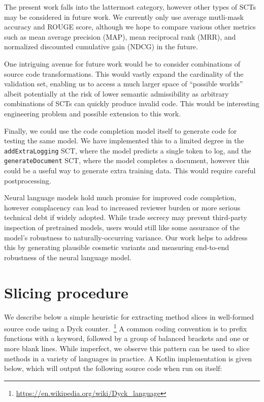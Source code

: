 \documentclass[sigconf,review,anonymous]{acmart}
\begin{document}
  The present work falls into the lattermost category, however other types of SCTs may be considered in future work. We currently only use average mutli-mask accuracy and ROUGE score, although we hope to compare various other metrics such as mean average precision (MAP), mean reciprocal rank (MRR), and normalized discounted cumulative gain (NDCG) in the future.

   One intriguing avenue for future work would be to consider combinations of source code transformations. This would vastly expand the cardinality of the validation set, enabling us to access a much larger space of ``possible worlds'' albeit potentially at the risk of lower semantic admissibility as arbitrary combinations of SCTs can quickly produce invalid code. This would be interesting engineering problem and possible extension to this work.

  Finally, we could use the code completion model itself to generate code for testing the same model. We have implemented this to a limited degree in the \lstinline|addExtraLogging| SCT, where the model predicts a single token to log, and the \lstinline|generateDocument| SCT, where the model completes a document, however this could be a useful way to generate extra training data. This would require careful postprocessing.

  Neural language models hold much promise for improved code completion, however complacency can lead to increased reviewer burden or more serious technical debt if widely adopted. While trade secrecy may prevent third-party inspection of pretrained models, users would still like some assurance of the model's robustness to naturally-occurring variance. Our work helps to address this by generating plausible cosmetic variants and measuring end-to-end robustness of the neural language model.
  \pagebreak
  
  \appendix

  \section{Slicing procedure}\label{sec:slicing}

  We describe below a simple heuristic for extracting method slices in well-formed source code using a Dyck counter.~\footnote{\url{https://en.wikipedia.org/wiki/Dyck\_language}} A common coding convention is to prefix functions with a keyword, followed by a group of balanced brackets and one or more blank lines. While imperfect, we observe this pattern can be used to slice methods in a variety of languages in practice. A Kotlin implementation is given below, which will output the following source code when run on itself:
\end{document}
